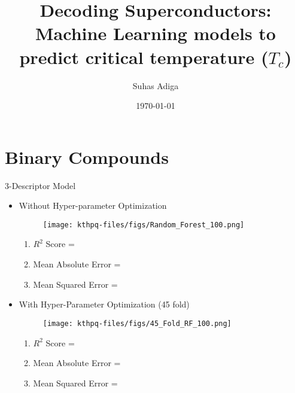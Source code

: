 \documentclass[14pt, t, lualatex]{beamer}
\title{Decoding Superconductors: Machine Learning models to predict critical temperature ($T_{c}$)}
\institute[]{Jawaharlal Nehru Centre for Advanced Scientific Research}
\date{\today}
\author{Suhas Adiga}
\begin{document}
\inserttitlepage

\section{Binary Compounds}
\begin{frame}{3-Descriptor Model}
\begin{minipage}[t]{0.5\linewidth}
\begin{itemize}
    \item Without Hyper-parameter Optimization 
    \begin{figure}
        \centering
        \texttt{[image: kthpq-files/figs/Random\_Forest\_100.png]}
    \end{figure}
    \begin{enumerate}
        \item $R^{2}$ Score = 
        \item Mean Absolute Error =
        \item Mean Squared Error = 
    \end{enumerate}
\end{itemize}
\end{minipage}%
\hfill%
\begin{minipage}[t]{0.5\linewidth}
\begin{itemize}
    \item With Hyper-Parameter Optimization (45 fold) 
    \begin{figure}
        \centering
        \texttt{[image: kthpq-files/figs/45\_Fold\_RF\_100.png]}
    \end{figure}
    \begin{enumerate}
        \item $R^{2}$ Score = 
        \item Mean Absolute Error =
        \item Mean Squared Error = 
    \end{enumerate}
\end{itemize}
\end{minipage}%
\end{frame}
\end{document}
